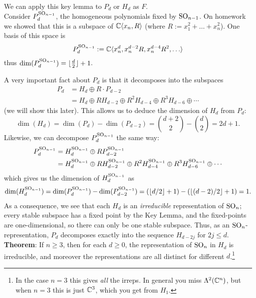\documentclass{amsart}
\begin{document}
We can apply this key lemma to $P_d$ or $H_d$ as $F$.\\

Consider $P_d^{\operatorname{SO}_{n-1}}$, the homogeneous polynomials fixed by $\operatorname{SO}_{n-1}$. On homework we showed that this is a subspace of $\mathbb{C}\langle x_n,R\rangle$ (where $R:=x_1^2+\dots+x_n^2$). One basis of this space is
$$
P_d^{\SO_{n-1}} := \C\<x_n^d,x_n^{d-2}R,x_n^{d-4}R^2,\dots\>
$$
thus $\dim(P_d^{\operatorname{SO}_{n-1}})=\lfloor \tfrac{d}{2} \rfloor + 1$. 

A very important fact about $P_d$ is that it decomposes into the subspaces
\begin{align*}
P_d &= H_d \oplus R\cdot P_{d-2}\\
&= H_d \oplus R H_{d-2} \oplus R^2 H_{d-4} \oplus R^3H_{d-6} \oplus \cdots 
\end{align*}
(we will show this later). This allows us to deduce the dimension of $H_d$ from $P_d$:
$$
\dim(H_d) = \dim(P_d) - \dim(P_{d-2}) = {d+2 \choose 2} - {d \choose 2} = 2d+1.
$$
Likewise, we can decompose $P_d^{\operatorname{SO}_{n-1}}$ the same way:
\begin{align*}
P_d^{\operatorname{SO}_{n-1}} &= H_d^{\operatorname{SO}_{n-1}} \oplus R P_{d-2}^{\operatorname{SO}_{n-1}} \\
&= H_d^{\operatorname{SO}_{n-1}} \oplus R H_{d-2}^{\operatorname{SO}_{n-1}} \oplus R^2 H_{d-4}^{\operatorname{SO}_{n-1}} \oplus R^3H_{d-6}^{\operatorname{SO}_{n-1}} \oplus \cdots 
\end{align*}
which gives us the dimension of $H_d^{\operatorname{SO}_{n-1}}$ as
$$
\dim(H_d^{\operatorname{SO}_{n-1}}) = \dim(P_d^{\operatorname{SO}_{n-1}}) - \dim(P_{d-2}^{\operatorname{SO}_{n-1}}) = (\lfloor d/2\rfloor + 1) - (\lfloor (d-2)/2\rfloor + 1) = 1.
$$
As a consequence, we see that each $H_d$ is an \textit{irreducible} representation of $\operatorname{SO}_n$; every stable subspace has a fixed point by the Key Lemma, and the fixed-points are one-dimensional, so there can only be one stable subspace. Thus, as an $\operatorname{SO}_n$-representation, $P_d$ decomposes exactly into the sequence $H_{d-2j}$ for $2j\leq d$.\\

\noindent \textbf{Theorem}: If $n\geq 3$, then for each $d\geq 0$, the representation of $\operatorname{SO}_n$ in $H_d$ is irreducible, and moreover the representations are all distinct for different $d$.\footnote{In the case $n=3$ this gives \textit{all} the irreps. In general you miss $\Lambda^2(\mathbb{C}^n)$, but when $n=3$ this is just $\mathbb{C}^3$, which you get from $H_1$.}
\end{document}

